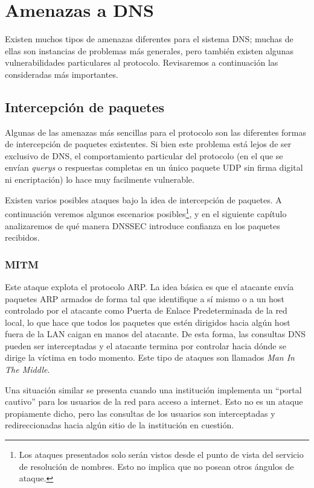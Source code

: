 \chapter{Amenazas a DNS}

Existen muchos tipos de amenazas diferentes para el sistema DNS; muchas de ellas son instancias de problemas m\'as generales, pero tambi\'en existen algunas vulnerabilidades particulares al protocolo. Revisaremos a continuaci\'on las consideradas m\'as importantes\cite{rfc3833}.

\section{Intercepci\'on de paquetes}

Algunas de las amenazas m\'as sencillas para el protocolo son las diferentes formas de intercepci\'on de paquetes existentes. Si bien este problema est\'a lejos de ser exclusivo de DNS, el comportamiento particular del protocolo (en el que se env\'ian \textit{querys} o respuestas completas en un \'unico paquete UDP sin firma digital ni encriptaci\'on) lo hace muy facilmente vulnerable. 

Existen varios posibles ataques bajo la idea de intercepci\'on de paquetes. A continuaci\'on veremos algunos escenarios posibles\footnote{Los ataques presentados solo ser\'an vistos desde el punto de vista del servicio de resoluci\'on de nombres. Esto no implica que no posean otros \'angulos de ataque.}, y en el siguiente cap\'itulo analizaremos de qu\'e manera DNSSEC introduce confianza en los paquetes recibidos.

\subsection{MITM}

Este ataque explota el protocolo ARP. La idea b\'asica es que el atacante
env\'ia paquetes ARP armados de forma tal que identifique a s\'i mismo o a un
host controlado por el atacante como Puerta de Enlace Predeterminada de la red
local, lo que hace que todos los paquetes que est\'en dirigidos hacia alg\'un
host fuera de la LAN caigan en manos del atacante. De esta forma, las consultas
DNS pueden ser interceptadas y el atacante termina por controlar hacia d\'onde
se dirige la v\'ictima en todo momento. Este tipo de ataques son llamados
\textit{Man In The Middle}.

Una situación similar se presenta cuando una institución implementa un ``portal
cautivo'' para los usuarios de la red para acceso a internet. Esto no es un
ataque propiamente dicho, pero las consultas de los usuarios son interceptadas
y redireccionadas hacia algún sitio de la institución en cuestión.

